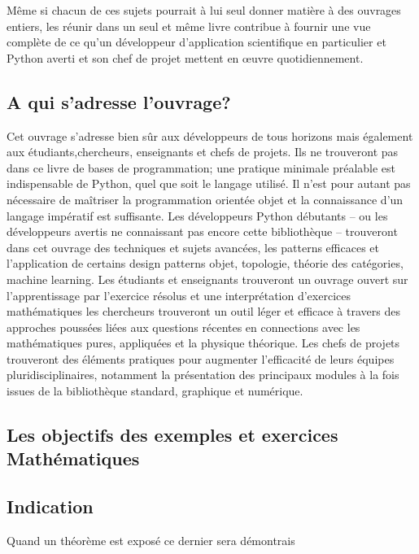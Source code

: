Même si chacun de ces sujets pourrait à lui seul donner matière à des ouvrages entiers, les réunir dans 
un seul et même livre contribue à fournir une vue complète de ce qu’un développeur d'application 
scientifique en particulier et Python averti et son chef de projet mettent en œuvre quotidiennement.

\subsection*{A qui s'adresse l'ouvrage?}
Cet ouvrage s’adresse bien sûr aux développeurs de tous horizons mais également aux
étudiants,chercheurs, enseignants et chefs de projets. Ils ne trouveront pas dans ce livre de bases de 
programmation; une pratique minimale préalable est indispensable de Python, quel que soit le langage 
utilisé. Il n’est pour autant pas nécessaire de maîtriser la programmation orientée objet et 
la connaissance d’un langage impératif est suffisante.
Les développeurs Python débutants – ou les développeurs avertis ne connaissant pas
encore cette bibliothèque – trouveront dans cet ouvrage des techniques et sujets avancées, les patterns 
efficaces et l’application de certains design patterns objet, topologie, théorie des catégories, machine
learning.
Les étudiants et enseignants trouveront un ouvrage ouvert sur l'apprentissage par l'exercice résolus et 
une interprétation d’exercices mathématiques  
les chercheurs trouveront un outil léger et efficace à travers des approches poussées liées aux 
questions récentes en connections avec les mathématiques pures, appliquées et la physique théorique.
Les chefs de projets trouveront des éléments pratiques pour augmenter l’efficacité de
leurs équipes pluridisciplinaires, notamment la présentation des principaux modules à la fois issues de la bibliothèque standard, graphique et numérique.
\subsection*{Les objectifs des exemples et exercices Mathématiques}
\subsection*{Indication}
Quand un théorème est exposé ce dernier sera démontrais